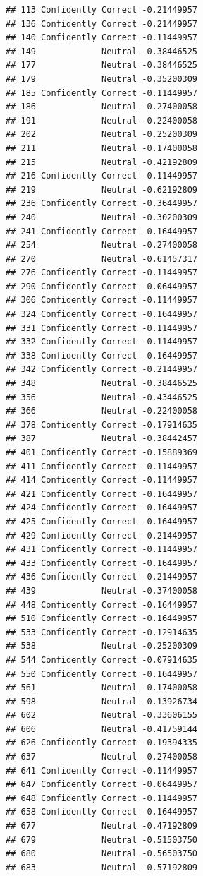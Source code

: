 \documentclass[
]{article}
\begin{document}
\begin{verbatim}
## 113 Confidently Correct -0.21449957
## 136 Confidently Correct -0.21449957
## 140 Confidently Correct -0.11449957
## 149             Neutral -0.38446525
## 177             Neutral -0.38446525
## 179             Neutral -0.35200309
## 185 Confidently Correct -0.11449957
## 186             Neutral -0.27400058
## 191             Neutral -0.22400058
## 202             Neutral -0.25200309
## 211             Neutral -0.17400058
## 215             Neutral -0.42192809
## 216 Confidently Correct -0.11449957
## 219             Neutral -0.62192809
## 236 Confidently Correct -0.36449957
## 240             Neutral -0.30200309
## 241 Confidently Correct -0.16449957
## 254             Neutral -0.27400058
## 270             Neutral -0.61457317
## 276 Confidently Correct -0.11449957
## 290 Confidently Correct -0.06449957
## 306 Confidently Correct -0.11449957
## 324 Confidently Correct -0.16449957
## 331 Confidently Correct -0.11449957
## 332 Confidently Correct -0.11449957
## 338 Confidently Correct -0.16449957
## 342 Confidently Correct -0.21449957
## 348             Neutral -0.38446525
## 356             Neutral -0.43446525
## 366             Neutral -0.22400058
## 378 Confidently Correct -0.17914635
## 387             Neutral -0.38442457
## 401 Confidently Correct -0.15889369
## 411 Confidently Correct -0.11449957
## 414 Confidently Correct -0.11449957
## 421 Confidently Correct -0.16449957
## 424 Confidently Correct -0.16449957
## 425 Confidently Correct -0.16449957
## 429 Confidently Correct -0.21449957
## 431 Confidently Correct -0.11449957
## 433 Confidently Correct -0.16449957
## 436 Confidently Correct -0.21449957
## 439             Neutral -0.37400058
## 448 Confidently Correct -0.16449957
## 510 Confidently Correct -0.16449957
## 533 Confidently Correct -0.12914635
## 538             Neutral -0.25200309
## 544 Confidently Correct -0.07914635
## 550 Confidently Correct -0.16449957
## 561             Neutral -0.17400058
## 598             Neutral -0.13926734
## 602             Neutral -0.33606155
## 606             Neutral -0.41759144
## 626 Confidently Correct -0.19394335
## 637             Neutral -0.27400058
## 641 Confidently Correct -0.11449957
## 647 Confidently Correct -0.06449957
## 648 Confidently Correct -0.11449957
## 658 Confidently Correct -0.16449957
## 677             Neutral -0.47192809
## 679             Neutral -0.51503750
## 680             Neutral -0.56503750
## 683             Neutral -0.57192809
\end{verbatim}
\end{document}
